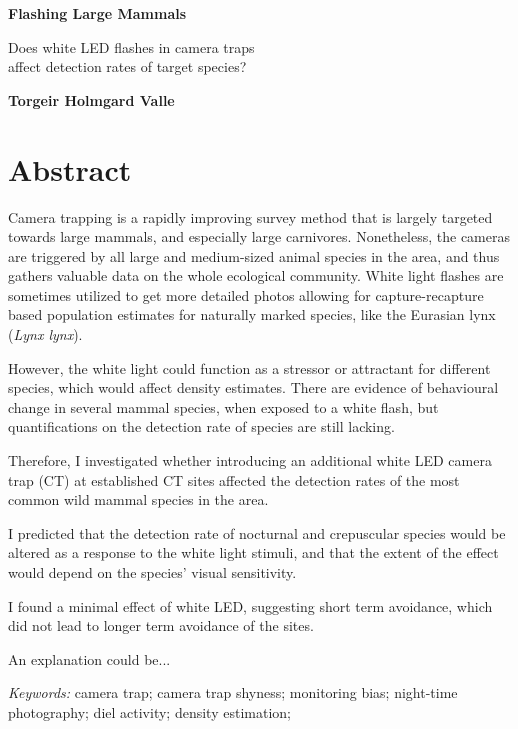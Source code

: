 \thispagestyle{plain}
\begin{center}
	\Large
	\textbf{Flashing Large Mammals}
	
	\vspace{0.4cm}
	\large
	Does white LED flashes in camera traps \\
	affect detection rates of target species?
	
	\vspace{0.4cm}
	\textbf{Torgeir Holmgard Valle}
	
	\vspace{0.9cm}
\end{center}
\newpage

\section{Abstract}

Camera trapping is a rapidly improving survey method that is largely targeted towards large mammals, and especially large carnivores.
Nonetheless, the cameras are triggered by all large and medium-sized animal species in the area, and thus gathers valuable data on the whole ecological community.
White light flashes are sometimes utilized to get more detailed photos allowing for capture-recapture based population estimates for naturally marked species, like the Eurasian lynx (\textit{Lynx lynx}).

However, the white light could function as a stressor or attractant for different species, which would affect density estimates. 
There are evidence of behavioural change in several mammal species, when exposed to a white flash, but quantifications on the detection rate of species are still lacking.


Therefore, I investigated whether introducing an additional white LED camera trap (CT) at established CT sites affected the detection rates of the most common wild mammal species in the area.

I predicted that the detection rate of nocturnal and crepuscular species would be altered as a response to the white light stimuli, and that the extent of the effect would depend on the species' visual sensitivity. 

I found a minimal effect of white LED, suggesting short term avoidance, which did not lead to longer term avoidance of the sites.

An explanation could be...


\textit{Keywords:} 
camera trap;
camera trap shyness; %
monitoring bias; %
night-time photography; %
diel activity; %
density estimation; %


